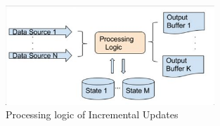 \documentclass[12pt, a4paper]{article}
\begin{document}
            \begin{figure}[H]
                \centering
                \includegraphics[width=0.7\textwidth]{Images/image (6).png}
                \vspace{1em}
                \caption{Processing logic of Incremental Updates}
            \end{figure}
        
\end{document}
